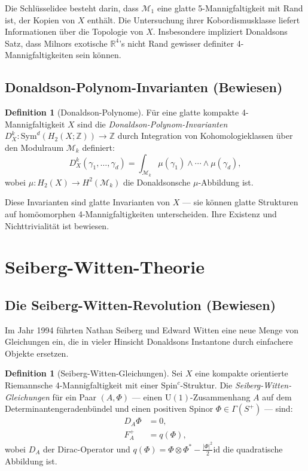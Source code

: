 \documentclass[12pt,a4paper]{amsart}
\theoremstyle{definition}
\newtheorem{definition}[theorem]{Definition}
\theoremstyle{remark}
\begin{document}
Die Schlüsselidee besteht darin, dass $\mathcal{M}_1$ eine glatte 5-Mannigfaltigkeit
mit Rand ist, der Kopien von $X$ enthält. Die Untersuchung ihrer Kobordismusklasse
liefert Informationen über die Topologie von $X$. Insbesondere impliziert Donaldsons
Satz, dass Milnors exotische $\mathbb{R}^4$'s nicht Rand gewisser definiter
4-Mannigfaltigkeiten sein können.

\subsection{Donaldson-Polynom-Invarianten (Bewiesen)}

\begin{definition}[Donaldson-Polynome]
Für eine glatte kompakte 4-Mannigfaltigkeit $X$ sind die \emph{Donaldson-Polynom-Invarianten}
$D^k_X: \mathrm{Sym}^d(H_2(X;\mathbb{Z})) \to \mathbb{Z}$ durch Integration von
Kohomologieklassen über den Modulraum $\mathcal{M}_k$ definiert:
\[
  D^k_X(\gamma_1, \ldots, \gamma_d) = \int_{\mathcal{M}_k} \mu(\gamma_1) \wedge \cdots \wedge \mu(\gamma_d),
\]
wobei $\mu: H_2(X) \to H^2(\mathcal{M}_k)$ die Donaldsonsche $\mu$-Abbildung ist.
\end{definition}

Diese Invarianten sind glatte Invarianten von $X$ — sie können glatte Strukturen auf
homöomorphen 4-Mannigfaltigkeiten unterscheiden. Ihre Existenz und Nichttrivialität
ist bewiesen.

\section{Seiberg-Witten-Theorie}
\label{sec:sw}

\subsection{Die Seiberg-Witten-Revolution (Bewiesen)}

Im Jahr 1994 führten Nathan Seiberg und Edward Witten \cite{SeibergWitten1994} eine neue
Menge von Gleichungen ein, die in vieler Hinsicht Donaldsons Instantone durch einfachere
Objekte ersetzen.

\begin{definition}[Seiberg-Witten-Gleichungen]
Sei $X$ eine kompakte orientierte Riemannsche 4-Mannigfaltigkeit mit einer $\mathrm{Spin}^c$-Struktur.
Die \emph{Seiberg-Witten-Gleichungen} für ein Paar $(A, \Phi)$ — einen $\mathrm{U}(1)$-Zusammenhang
$A$ auf dem Determinantengeradenbündel und einen positiven Spinor $\Phi \in \Gamma(S^+)$ — sind:
\begin{align}
  D_A \Phi &= 0, \label{gl:sw1} \\
  F_A^+ &= q(\Phi), \label{gl:sw2}
\end{align}
wobei $D_A$ der Dirac-Operator und $q(\Phi) = \Phi \otimes \Phi^* - \frac{|\Phi|^2}{2} \mathrm{id}$
die quadratische Abbildung ist.
\end{definition}
\end{document}
